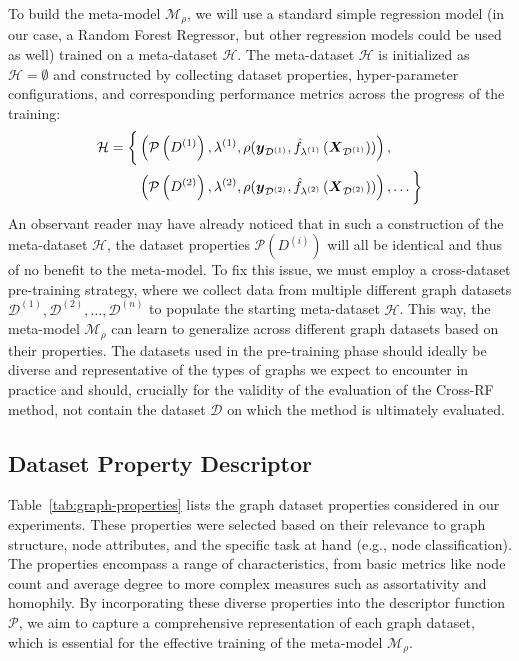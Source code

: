 To build the meta-model \( \mathcal{M}_\rho \), we will use a standard simple regression model (in our case, a Random Forest Regressor, but other regression models could be used as well) trained on a meta-dataset \( \mathcal{H} \).
The meta-dataset \( \mathcal{H} \) is initialized as \( \mathcal{H} = \emptyset \) and constructed by collecting dataset properties, hyper-parameter configurations, and corresponding performance metrics across the progress of the training:
\begin{equation*}
	\begin{split}
		\mathcal{H} = \biggl\{ &\left( \mathcal{P} \left( D^{(1)} \right), \lambda^{(1)}, \rho( \boldsymbol{y}_{\mathcal{D}^{(1)}}, \hat{f}_{\lambda^{(1)}} \left( \boldsymbol{X}_{\mathcal{D}^{(1)}} \right) ) \right), \\
		&\left( \mathcal{P} \left( D^{(2)} \right), \lambda^{(2)}, \rho( \boldsymbol{y}_{\mathcal{D}^{(2)}}, \hat{f}_{\lambda^{(2)}} \left( \boldsymbol{X}_{\mathcal{D}^{(2)}} \right) ) \right), \dots \biggr\}
	\end{split}
\end{equation*}
An observant reader may have already noticed that in such a construction of the meta-dataset \( \mathcal{H} \), the dataset properties \( \mathcal{P} \left( D^{(i)} \right) \) will all be identical and thus of no benefit to the meta-model. To fix this issue, we must employ a cross-dataset pre-training strategy, where we collect data from multiple different graph datasets \( \mathcal{D}^{(1)}, \mathcal{D}^{(2)}, \dots, \mathcal{D}^{(n)} \) to populate the starting meta-dataset \( \mathcal{H} \). This way, the meta-model \( \mathcal{M}_\rho \) can learn to generalize across different graph datasets based on their properties. The datasets used in the pre-training phase should ideally be diverse and representative of the types of graphs we expect to encounter in practice and should, crucially for the validity of the evaluation of the Cross-RF method, not contain the dataset \( \mathcal{D} \) on which the method is ultimately evaluated.

\subsection{Dataset Property Descriptor}

Table~\ref{tab:graph-properties} lists the graph dataset properties considered in our experiments. These properties were selected based on their relevance to graph structure, node attributes, and the specific task at hand (e.g., node classification). The properties encompass a range of characteristics, from basic metrics like node count and average degree to more complex measures such as assortativity and homophily. By incorporating these diverse properties into the descriptor function \( \mathcal{P} \), we aim to capture a comprehensive representation of each graph dataset, which is essential for the effective training of the meta-model \( \mathcal{M}_\rho \).

